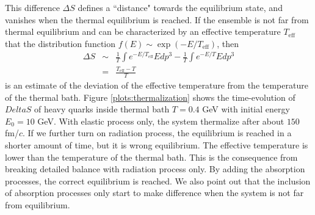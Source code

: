 \documentclass[aps, prc, reprint, amsmath, groupedaddress, nofootinbib]{revtex4-1}
\begin{document}
This difference $\Delta S$ defines a ``distance" towards the equilibrium state, and vanishes when the thermal equilibrium is reached.
If the ensemble is not far from thermal equilibrium and can be characterized by an effective temperature $T_{\textrm{eff}}$ that the distribution function $f(E)\sim \exp(-E/T_{\textrm{eff}})$, then
\begin{eqnarray}
\nonumber
\Delta S &\sim& \frac{1}{T}\int  e^{-E/T_{\textrm{eff}}} E dp^3 - \frac{1}{T}\int e^{-E/T} E dp^3 \\
&=& \frac{T_\textrm{eff}-T}{T}
\end{eqnarray}
is an estimate of the deviation of the effective temperature from the temperature of the thermal bath.
Figure \ref{plots:thermalization} shows the time-evolution of $Delta S$ of heavy quarks inside thermal bath $T=0.4$ GeV with initial energy $E_0 = 10$ GeV.
With elastic process only, the system thermalize after about $150$ fm/$c$.
If we further turn on radiation process, the equilibrium is reached in a shorter amount of time, but it is wrong equilibrium.
The effective temperature is lower than the temperature of the thermal bath.
This is the consequence from breaking detailed balance with radiation process only.
By adding the absorption processes, the correct equilibrium is reached.
We also point out that the inclusion of absorption processes only start to make difference when the system is not far from equilibrium.
\end{document}
